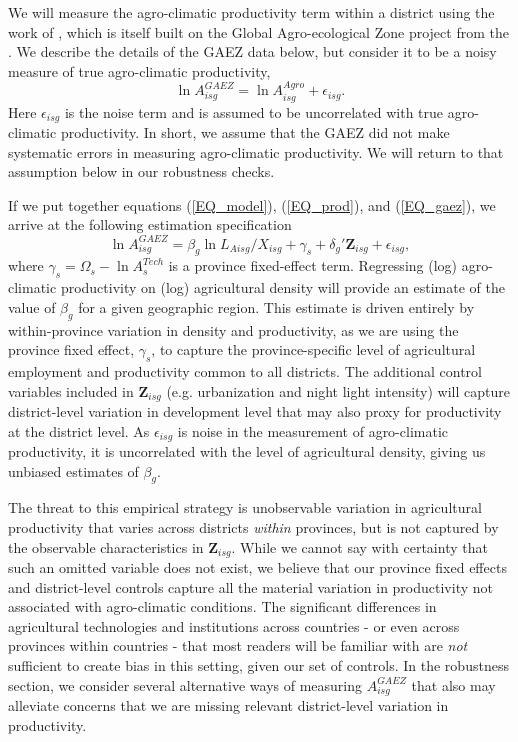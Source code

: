 \documentclass[11pt]{article}
\begin{document}
We will measure the agro-climatic productivity term within a district using the work of \cite{galorozak2016}, which is itself built on the Global Agro-ecological Zone project from the \cite{gaez}. We describe the details of the GAEZ data below, but consider it to be a noisy measure of true agro-climatic productivity,
\begin{equation}
	\ln A_{isg}^{GAEZ} = \ln A_{isg}^{Agro} + \epsilon_{isg}. \label{EQ_gaez}
\end{equation}
Here $\epsilon_{isg}$ is the noise term and is assumed to be uncorrelated with true agro-climatic productivity. In short, we assume that the GAEZ did not make systematic errors in measuring agro-climatic productivity. We will return to that assumption below in our robustness checks.

If we put together equations (\ref{EQ_model}), (\ref{EQ_prod}), and (\ref{EQ_gaez}), we arrive at the following estimation specification 
\begin{equation}
	\ln A^{GAEZ}_{isg} = \beta_g \ln L_{Aisg}/X_{isg} + \gamma_{s} + \delta_g' \mathbf{Z}_{isg} + \epsilon_{isg}, \label{EQ_regress}
\end{equation}
where $\gamma_s = \Omega_s - \ln A_{s}^{Tech}$ is a province fixed-effect term. Regressing (log) agro-climatic productivity on (log) agricultural density will provide an estimate of the value of $\beta_g$ for a given geographic region. This estimate is driven entirely by within-province variation in density and productivity, as we are using the province fixed effect, $\gamma_s$, to capture the province-specific level of agricultural employment and productivity common to all districts. The additional control variables included in $\mathbf{Z}_{isg}$ (e.g. urbanization and night light intensity) will capture district-level variation in development level that may also proxy for productivity at the district level. As $\epsilon_{isg}$ is noise in the measurement of agro-climatic productivity, it is uncorrelated with the level of agricultural density, giving us unbiased estimates of $\beta_g$.

The threat to this empirical strategy is unobservable variation in agricultural productivity that varies across districts \textit{within} provinces, but is not captured by the observable characteristics in $\mathbf{Z}_{isg}$. While we cannot say with certainty that such an omitted variable does not exist, we believe that our province fixed effects and district-level controls capture all the material variation in productivity not associated with agro-climatic conditions. The significant differences in agricultural technologies and institutions across countries -  or even across provinces within countries - that most readers will be familiar with are \textit{not} sufficient to create bias in this setting, given our set of controls. In the robustness section, we consider several alternative ways of measuring $A^{GAEZ}_{isg}$ that also may alleviate concerns that we are missing relevant district-level variation in productivity.
\end{document}
